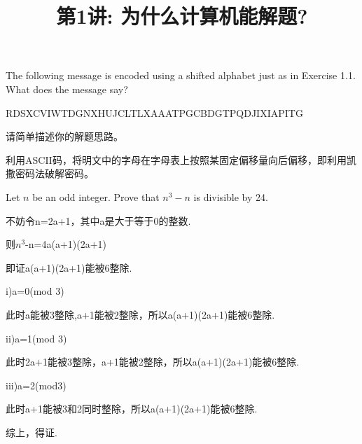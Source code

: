 \documentclass[a4paper, justified]{tufte-handout}
\title{第1讲: 为什么计算机能解题?}
\date{\zhtoday} %
\begin{document}
\maketitle
\noplagiarism %
\begin{abstract}
  \begin{center}{}
  \end{center}
\end{abstract}
\beginrequired

\begin{problem}[UD Problem $1.6$]
The following message is encoded using a shifted alphabet just as in Exercise 1.1.
What does the message say?

RDSXCVIWTDGNXHUJCLTLXAAATPGCBDGTPQDJIXIAPITG

请简单描述你的解题思路。
\end{problem}

\begin{solution}

  利用ASCII码，将明文中的字母在字母表上按照某固定偏移量向后偏移，即利用凯撒密码法破解密码。

\end{solution}

\begin{problem}[UD Problem $1.9$]
Let $n$ be an odd integer. Prove that $n^3 − n$ is divisible by 24.
\end{problem}

\begin{solution}

  不妨令n=2a+1，其中a是大于等于0的整数.

  则$n^3$-n=4a(a+1)(2a+1)

  即证a(a+1)(2a+1)能被6整除.

  i)a=0(mod 3)

  此时a能被3整除,a+1能被2整除，所以a(a+1)(2a+1)能被6整除.

  ii)a=1(mod 3)

  此时2a+1能被3整除，a+1能被2整除，所以a(a+1)(2a+1)能被6整除.

  iii)a=2(mod3)

  此时a+1能被3和2同时整除，所以a(a+1)(2a+1)能被6整除.

  综上，得证.

\end{solution}
\end{document}
